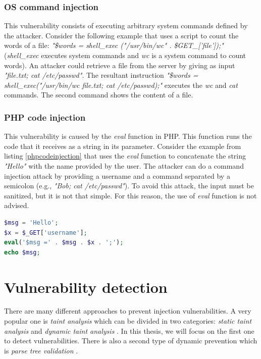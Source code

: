 \subsubsection{OS command injection}
This vulnerability consists of executing arbitrary system commands defined by the attacker. Consider the following example that uses a script to count the words of a file: \textit{"\$words = shell\_exec ("/usr/bin/wc" . \$GET\_['file']);"} (\textit{shell\_exec} executes system commands and \textit{wc} is a system command to count words). An attacker could retrieve a file from the server by giving as input \textit{"file.txt; cat /etc/passwd"}. The resultant instruction \textit{"\$words = shell\_exec("/usr/bin/wc file.txt; cat /etc/passwd);"} executes the \textit{wc} and \textit{cat} commands. The second command shows the content of a file.

\subsubsection{PHP code injection}
This vulnerability is caused by the \textit{eval} function in PHP. This function runs the code that it receives as a string in its parameter. Consider the example from listing \ref{phpcodeinjection} that uses the \textit{eval} function to concatenate the string \textit{"Hello"} with the name provided by the user. The attacker can do a command injection attack by providing a username and a command separated by a semicolon (e.g., \textit{"Bob; cat /etc/passwd"}). To avoid this attack, the input must be sanitized, but it is not that simple. For this reason, the use of \textit{eval} function is not advised.


\begin{lstlisting}[language=PHP,showstringspaces=false, 
  caption={PHP script vulnerable to code injection},label=phpcodeinjection,captionpos=b]
$msg = 'Hello';
$x = $_GET['username'];
eval('$msg =' . $msg . $x . ';');
echo $msg;
\end{lstlisting}




\section{Vulnerability detection}
\label{relatedwork}
There are many different approaches to prevent injection vulnerabilities. A very popular one is \textit{taint analysis} which can be divided in two categories: \textit{static taint analysis} and \textit{dynamic taint analysis} \cite{schwartz2010all}. In this thesis, we will focus on the first one to detect vulnerabilities. There is also a second type of dynamic prevention which is \textit{parse tree validation} \cite{sqlparsetree1,sqlparsetree2}.

